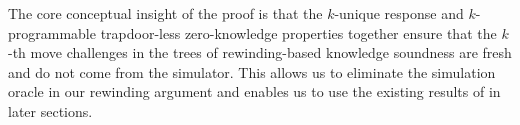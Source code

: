 The core conceptual insight of the proof is that the $k$-unique response  and $k$-programmable trapdoor-less zero-knowledge properties together ensure that the $k$-th move challenges in the trees of rewinding-based knowledge soundness are fresh and do not come from the simulator. This allows us to eliminate the simulation oracle in our rewinding argument and enables us to use the existing results of \cite{EPRINT:AttFehKlo21short} in later sections.



%



